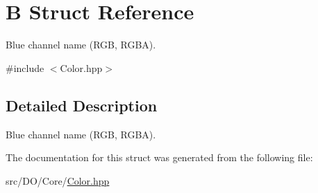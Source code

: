 \hypertarget{struct_d_o_1_1_b}{\section{B Struct Reference}
\label{struct_d_o_1_1_b}
}


Blue channel name (R\-G\-B, R\-G\-B\-A).  




{\ttfamily \#include $<$Color.\-hpp$>$}



\subsection{Detailed Description}
Blue channel name (R\-G\-B, R\-G\-B\-A). 

The documentation for this struct was generated from the following file\-:\begin{DoxyCompactItemize}
\item 
src/\-D\-O/\-Core/\hyperlink{_color_8hpp}{Color.\-hpp}\end{DoxyCompactItemize}
